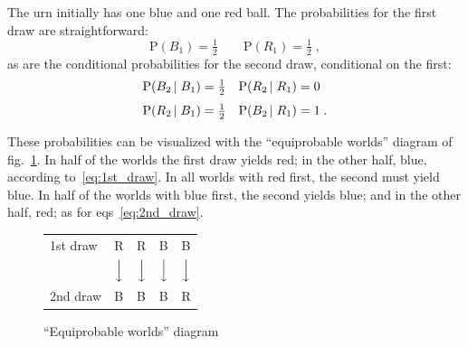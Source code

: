 \documentclass[\ifafour a4paper,12pt,\else a5paper,10pt,\fi%
onecolumn,oneside,article,%
british%
]{memoir}
\theoremstyle{remark}
\theoremstyle{innote}
\newcommand*{\p}{\mathrm{P}}%
\renewcommand*{\|}[1][]{\nonscript\,#1\vert\nonscript\;\mathopen{}}
\newcommand*{\eqns}{eqs}%
\newcommand*{\fig}{fig.}%
\begin{document}
The urn initially has one blue and one red ball. The probabilities for the
first draw are straightforward:
\begin{equation}
  \label{eq:1st_draw}
  \p(B_{1}) = \tfrac{1}{2} \qquad \p(R_{1}) = \tfrac{1}{2} \;,
\end{equation}
as are the conditional probabilities for the second draw, conditional on
the first:
\begin{subequations}
  \label{eq:2nd_draw}
  \begin{align}
    \p(B_{2} \|B_{1}) &= \tfrac{1}{2}
    & \p(R_{2} \| R_{1}) &= 0
      \label{eq:2nd_draw_equal}
    \\[\jot]
    \p(R_{2} \|B_{1}) &= \tfrac{1}{2}
    & \p(B_{2} \| R_{1}) &= 1 \;.
      \label{eq:2nd_draw_mixed}
  \end{align}
\end{subequations}

These probabilities can be visualized with the \enquote{equiprobable
  worlds} diagram of \fig~\ref{fig:worlds}. In half of the worlds the first
draw yields red; in the other half, blue, according to~\eqref{eq:1st_draw}.
In all worlds with red first, the second must yield blue. In half of the
worlds with blue first, the second yields blue; and in the other half, red;
as for \eqns~\eqref{eq:2nd_draw}.
\begin{figure}[t]
  \begin{framed}
    \centering
    \caption{\enquote{Equiprobable worlds} diagram}\label{fig:worlds}
    \begin{tabular}{p{5em} p{1em} p{1em} p{1em} p{1em} }
      {{\footnotesize 1st draw}}& R& R & B & B
      \\[1ex]
        & $\Big\downarrow$& $\Big\downarrow$
                                   & $\Big\downarrow$& $\Big\downarrow$
      \\[2ex]
      {{\footnotesize 2nd draw}}& B& B & B & R
    \end{tabular}
  \end{framed}
\end{figure}
\end{document}
